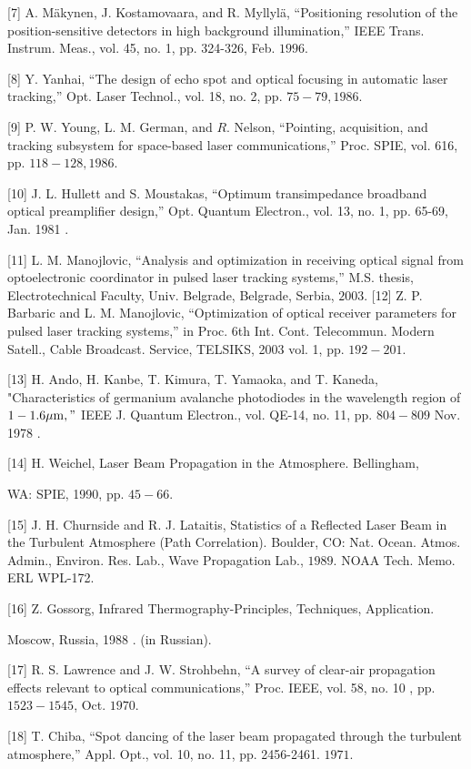 \documentclass[10pt]{article}
\begin{document}
[7] A. Mäkynen, J. Kostamovaara, and R. Myllylä, “Positioning resolution of the position-sensitive detectors in high background illumination,” IEEE Trans. Instrum. Meas., vol. 45, no. 1, pp. 324-326, Feb. \(1996 .\)

[8] Y. Yanhai, “The design of echo spot and optical focusing in automatic laser tracking,” Opt. Laser Technol., vol. 18, no. 2, pp. \(75-79,1986 .\)

[9] P. W. Young, L. M. German, and \(R\). Nelson, “Pointing, acquisition, and tracking subsystem for space-based laser communications,” Proc. SPIE, vol. 616, pp. \(118-128,1986\).

[10] J. L. Hullett and S. Moustakas, “Optimum transimpedance broadband optical preamplifier design,” Opt. Quantum Electron., vol. 13, no. 1, pp. 65-69, Jan. 1981 .

[11] L. M. Manojlovic, “Analysis and optimization in receiving optical signal from optoelectronic coordinator in pulsed laser tracking systems,” M.S. thesis, Electrotechnical Faculty, Univ. Belgrade, Belgrade, Serbia, \(2003 .\) [12] Z. P. Barbaric and L. M. Manojlovic, “Optimization of optical receiver parameters for pulsed laser tracking systems,” in Proc. 6th Int. Cont. Telecommun. Modern Satell., Cable Broadcast. Service, TELSIKS, 2003 vol. 1, pp. \(192-201\).

[13] H. Ando, H. Kanbe, T. Kimura, T. Yamaoka, and T. Kaneda, "Characteristics of germanium avalanche photodiodes in the wavelength region of \(1-1.6 \mu \mathrm{m}, "\) IEEE J. Quantum Electron., vol. QE-14, no. 11, pp. \(804-809\) Nov. 1978 .

[14] H. Weichel, Laser Beam Propagation in the Atmosphere. Bellingham,

WA: SPIE, 1990, pp. \(45-66 .\)

[15] J. H. Churnside and R. J. Lataitis, Statistics of a Reflected Laser Beam in the Turbulent Atmosphere (Path Correlation). Boulder, CO: Nat. Ocean. Atmos. Admin., Environ. Res. Lab., Wave Propagation Lab., \(1989 .\) NOAA Tech. Memo. ERL WPL-172.

[16] Z. Gossorg, Infrared Thermography-Principles, Techniques, Application.

Moscow, Russia, 1988 . (in Russian).

[17] R. S. Lawrence and J. W. Strohbehn, “A survey of clear-air propagation effects relevant to optical communications,” Proc. IEEE, vol. 58, no. 10 , pp. \(1523-1545\), Oct. \(1970 .\)

[18] T. Chiba, “Spot dancing of the laser beam propagated through the turbulent atmosphere,” Appl. Opt., vol. 10, no. 11, pp. 2456-2461. \(1971 .\)
\end{document}
